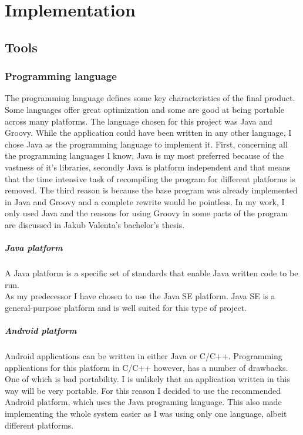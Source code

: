 \documentclass[11pt,twoside,a4paper]{book}
\begin{document}
\chapter{Implementation}


\section{Tools}
\subsection{Programming language}
The programming language defines some key characteristics of the final product. Some languages offer great optimization and some are good at being portable across many platforms. The language chosen for this project was Java and Groovy\cite{whatIsGroovy}. While the application could have been written in any other language, I chose Java as the programming language to implement it. First, concerning all the programming languages I know, Java is my most preferred because of the vastness of it's libraries, secondly Java is platform independent and that means that the time intensive task of recompiling the program for different platforms is removed. The third reason is because the base program was already implemented in Java and Groovy and a complete rewrite would be pointless. In my work, I only used Java and the reasons for using Groovy in some parts of the program are discussed in Jakub Valenta's bachelor's thesis\cite{bakalarkaJV}.

\paragraph{Java platform}
A Java platform is a specific set of standards that enable Java written code to be run. \\
As my predecessor I have chosen to use the Java SE\cite{whatIsJavaSE} platform. Java SE is a general-purpose platform and is well suited for this type of project.

\paragraph{Android platform}
Android applications can be written in either Java or C/C++. Programming applications for this platform in C/C++ however, has a number of drawbacks. One of which is bad portability. I is unlikely that an application written in this way will be very portable. For this reason I decided to use the recommended Android platform, which uses the Java programing language. This also made implementing the whole system easier as I was using only one language, albeit different platforms.
\end{document}

